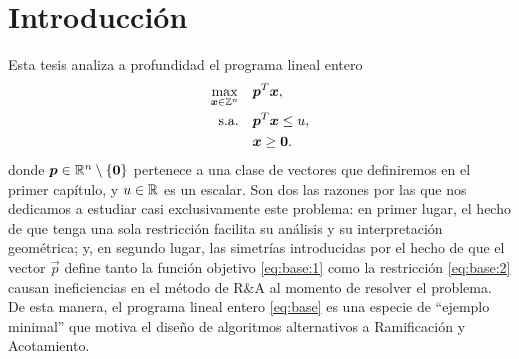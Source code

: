 \chapter*{Introducción}
\noindent
Esta tesis analiza a profundidad el programa lineal entero
\begin{subequations}
	\label{eq:base}
	\begin{align}
		\max_{\boldsymbol{x} \in \mathbb{Z}^n} \quad
			& \boldsymbol{p}^T\boldsymbol{x}, \label{eq:base:1} \\
		\text{s.a.} \quad
			& \boldsymbol{p}^T\boldsymbol{x} \leq u, \label{eq:base:2} \\
			& \boldsymbol{x} \geq \boldsymbol{0}. \nonumber
	\end{align}
\end{subequations}
donde $\boldsymbol{p} \in \mathbb{R}^n \setminus \lbrace \boldsymbol{0} \rbrace$ pertenece a una clase de vectores que
definiremos en el primer capítulo, y $u \in \mathbb{R}$ es un escalar. Son dos las razones por las que nos
dedicamos a estudiar casi exclusivamente este problema: en primer lugar, el hecho de que
tenga una sola restricción facilita su análisis y su interpretación geométrica; y, en segundo
lugar, las simetrías introducidas por el hecho de que el vector $\vec{p}$ define tanto la función
objetivo \eqref{eq:base:1} como la restricción \eqref{eq:base:2} causan ineficiencias en el
método de R\&A al momento de resolver el problema. De esta manera, el programa
lineal entero \eqref{eq:base} es una especie de ``ejemplo minimal'' que motiva el diseño de
algoritmos alternativos a Ramificación y Acotamiento.



